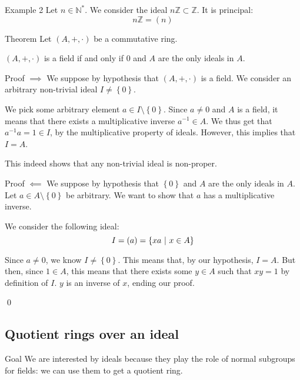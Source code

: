 \documentclass[a4paper]{article}
\begin{document}
\begin{parag}{Example 2}
    Let $n \in \mathbb{N}^*$. We consider the ideal $n \mathbb{Z} \subset \mathbb{Z}$. It is principal: 
    \[n\mathbb{Z} = \left(n\right)\]
\end{parag}

\begin{parag}{Theorem}
    Let $\left(A, +, \cdot \right)$ be a commutative ring.

    $\left(A, +, \cdot \right)$ is a field if and only if $0$ and $A$ are the only ideals in $A$.

    \begin{subparag}{Proof $\implies$}
        We suppose by hypothesis that $\left(A, +, \cdot \right)$ is a field. We consider an arbitrary non-trivial ideal $I \neq \left\{0\right\}$.

        We pick some arbitrary element $a \in I \setminus \left\{0\right\}$. Since $a \neq 0$ and $A$ is a field, it means that there exists a multiplicative inverse $a^{-1} \in A$. We thus get that $a^{-1} a = 1 \in I$, by the multiplicative property of ideals. However, this implies that $I = A$.

        This indeed shows that any non-trivial ideal is non-proper.
    \end{subparag}

    \begin{subparag}{Proof $\impliedby$}
        We suppose by hypothesis that $\left\{0\right\}$ and $A$ are the only ideals in $A$. Let $a \in A \setminus \left\{0\right\}$ be arbitrary. We want to show that $a$ has a multiplicative inverse.

        We consider the following ideal:
        \[I = \left(a\right) = \left\{x a \suchthat x \in A\right\}\]

        Since $a \neq 0$, we know $I \neq \left\{0\right\}$. This means that, by our hypothesis, $I = A$. But then, since $1 \in A$, this means that there exists some $y \in A$ such that $xy = 1$ by definition of $I$. $y$ is an inverse of $x$, ending our proof.

        \qed
    \end{subparag}
\end{parag}

\subsection{Quotient rings over an ideal}

\begin{parag}{Goal}
    We are interested by ideals because they play the role of normal subgroups for fields: we can use them to get a quotient ring.
\end{parag}
\end{document}
